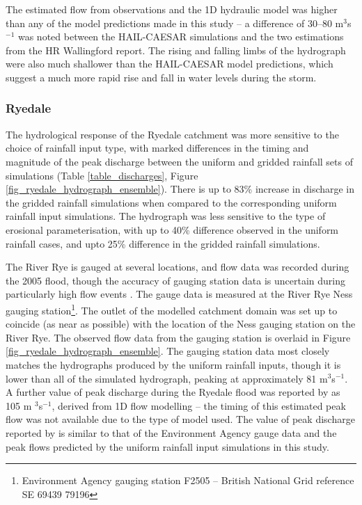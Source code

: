 The estimated flow from observations and the 1D hydraulic model was higher than any of the model predictions made in this study -- a difference of 30--80 m\(^3\)s\(^{-1}\) was noted between the HAIL-CAESAR simulations and the two estimations from the HR Wallingford report. The rising and falling limbs of the hydrograph were also much shallower than the HAIL-CAESAR model predictions, which suggest a much more rapid rise and fall in water levels during the storm. 

\subsubsection{Ryedale}

The hydrological response of the Ryedale catchment was more sensitive to the choice of rainfall input type, with marked differences in the timing and magnitude of the peak discharge between the uniform and gridded rainfall sets of simulations (Table \ref{table_discharges}, Figure \ref{fig_ryedale_hydrograph_ensemble}). There is up to 83\% increase in discharge in the gridded rainfall simulations when compared to the corresponding uniform rainfall input simulations. The hydrograph was less sensitive to the type of erosional parameterisation, with up to 40\% difference observed in the uniform rainfall cases, and upto 25\% difference in the gridded rainfall simulations. 

The River Rye is gauged at several locations, and flow data was recorded during the 2005 flood, though the accuracy of gauging station data is uncertain during particularly high flow events \citep{shaw2010hydrology}. The gauge data is measured at the River Rye Ness gauging station\footnote{Environment Agency gauging station F2505 -- British National Grid reference SE 69439 79196}. The outlet of the modelled catchment domain was set up to coincide (as near as possible) with the location of the Ness gauging station on the River Rye. The observed flow data from the gauging station is overlaid in Figure \ref{fig_ryedale_hydrograph_ensemble}. The gauging station data most closely matches the hydrographs produced by the uniform rainfall inputs, though it is lower than all of the simulated hydrograph, peaking at approximately 81 m\(^3\)s\(^{-1}\). A further value of peak discharge during the Ryedale flood was reported by \citet{wass2008investigation} as 105 m \(^3\)s\(^{-1}\), derived from 1D flow modelling -- the timing of this estimated peak flow was not available due to the type of model used. The value of peak discharge reported by \citet{wass2008investigation} is similar to that of the Environment Agency gauge data and the peak flows predicted by the uniform rainfall input simulations in this study. 

